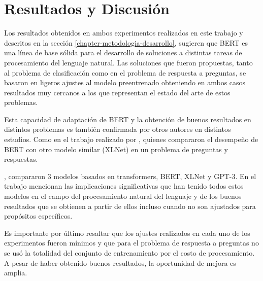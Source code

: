 
\cleardoublepage

\chapter{Resultados y Discusión}
\label{chapter-resultados-y-discusion}

Los resultados obtenidos en ambos experimentos realizados en este trabajo y descritos en la sección \ref{chapter-metodologia-desarrollo}, sugieren que BERT es una línea de base sólida para el desarrollo de soluciones a distintas tareas de procesamiento del lenguaje natural. Las soluciones que fueron propuestas, tanto al problema de clasificación como en el problema de respuesta a preguntas, se basaron en ligeros ajustes al modelo preentrenado obteniendo en ambos casos resultados muy cercanos a los que representan el estado del arte de estos problemas.

Esta capacidad de adaptación de BERT y la obtención de buenos resultados en distintos problemas es también confirmada por otros autores en distintos estudios. Como en el trabajo realizado por \cite{csedu20}, quienes compararon el desempeño de BERT con otro modelo similar (XLNet) en un problema de preguntas y respuestas. 

\cite{Topal_2021_exploring_https://doi.org/10.48550/arxiv.2102.08036}, compararon 3 modelos basados en transformers, BERT, XLNet y GPT-3. En el trabajo mencionan las implicaciones significativas que han tenido todos estos modelos en el campo del procesamiento natural del lenguaje y de los buenos resultados que se obtienen a partir de ellos incluso cuando no son ajustados para propósitos específicos. 

Es importante por último resaltar que los ajustes realizados en cada uno de los experimentos fueron mínimos y que para el problema de respuesta a preguntas no se usó la totalidad del conjunto de entrenamiento por el costo de procesamiento. A pesar de haber obtenido buenos resultados, la oportunidad de mejora es amplia.